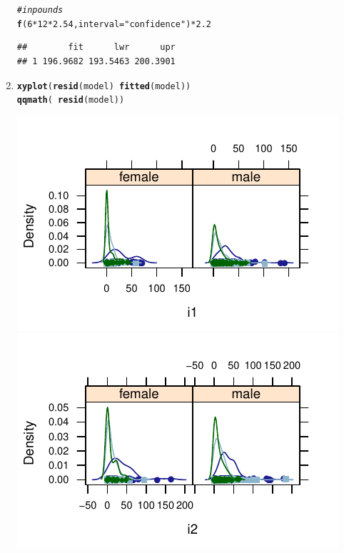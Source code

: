 \documentclass[twoside]{book}
\makeatletter
\def\maxwidth{ %
  \ifdim\Gin@nat@width>\linewidth
    \linewidth
  \else
    \Gin@nat@width
  \fi
}
\newcommand{\hlnum}[1]{\textcolor[rgb]{0.686,0.059,0.569}{#1}}%
\newcommand{\hlstr}[1]{\textcolor[rgb]{0.192,0.494,0.8}{#1}}%
\newcommand{\hlcom}[1]{\textcolor[rgb]{0.678,0.584,0.686}{\textit{#1}}}%
\newcommand{\hlopt}[1]{\textcolor[rgb]{0,0,0}{#1}}%
\newcommand{\hlstd}[1]{\textcolor[rgb]{0.345,0.345,0.345}{#1}}%
\newcommand{\hlkwc}[1]{\textcolor[rgb]{0.333,0.667,0.333}{#1}}%
\newcommand{\hlkwd}[1]{\textcolor[rgb]{0.737,0.353,0.396}{\textbf{#1}}}%
\newenvironment{kframe}{%
 \def\at@end@of@kframe{}%
 \ifinner\ifhmode%
  \def\at@end@of@kframe{\end{minipage}}%
  \begin{minipage}{\columnwidth}%
 \fi\fi%
 \def\FrameCommand##1{\hskip\@totalleftmargin \hskip-\fboxsep
 \colorbox{shadecolor}{##1}\hskip-\fboxsep
     \hskip-\linewidth \hskip-\@totalleftmargin \hskip\columnwidth}%
 \MakeFramed {\advance\hsize-\width
   \@totalleftmargin\z@ \linewidth\hsize
   \@setminipage}}%
 {\par\unskip\endMakeFramed%
 \at@end@of@kframe}
\newenvironment{knitrout}{}{} %
\makeatother
\begin{document}
\begin{solution}
\begin{enumerate}
\begin{knitrout}
\begin{kframe}
\begin{verbatim}
\end{verbatim}
\begin{alltt}
\hlcom{# in pounds}
\hlkwd{f}\hlstd{(}\hlnum{6} \hlopt{*} \hlnum{12} \hlopt{*} \hlnum{2.54}\hlstd{,} \hlkwc{interval} \hlstd{=} \hlstr{"confidence"}\hlstd{)} \hlopt{*} \hlnum{2.2}
\end{alltt}
\begin{verbatim}
##        fit      lwr      upr
## 1 196.9682 193.5463 200.3901
\end{verbatim}
\end{kframe}
\end{knitrout}
		\item
\begin{knitrout}
\color{fgcolor}\begin{kframe}
\begin{alltt}
\hlkwd{xyplot}\hlstd{(}\hlkwd{resid}\hlstd{(model)} \hlopt{~} \hlkwd{fitted}\hlstd{(model))}
\hlkwd{qqmath}\hlstd{(}\hlopt{~}\hlkwd{resid}\hlstd{(model))}
\end{alltt}
\end{kframe}

{\centering \includegraphics[width=\maxwidth]{figures/fig-unnamed-chunk-37-1} 
\includegraphics[width=\maxwidth]{figures/fig-unnamed-chunk-37-2} 

}
\end{knitrout}
\end{enumerate}
\end{solution}
\end{document}
